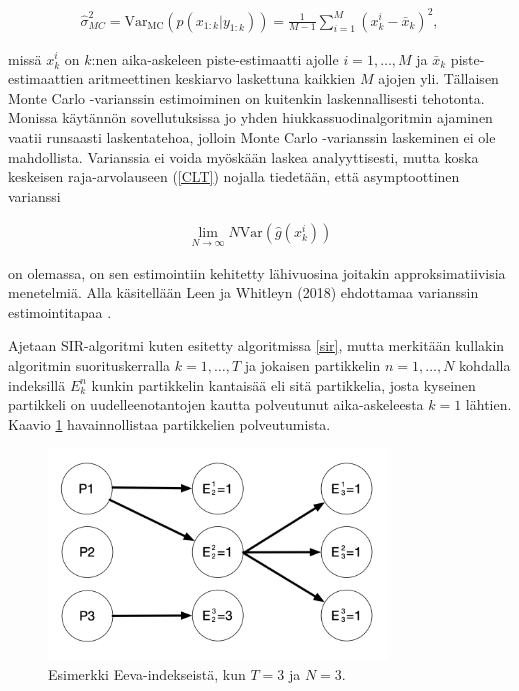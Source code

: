 \documentclass[
  12pt,
  a4paper, twoside]{book}
\begin{document}
\begin{align}\label{MC-varianssi}
\hat{\sigma}^2_{MC} = \text{Var}_{\text{MC}}(\hat{p}(x_{1:k}|y_{1:k})) = \frac{1}{M-1} \sum_{i=1}^{M}(x_k^i-\bar{x}_k)^2
,\end{align}

\noindent missä \(x_k^i\) on \(k\):nen aika-askeleen piste-estimaatti ajolle \(i=1,\ldots,M\) ja \(\bar{x}_k\) piste-estimaattien aritmeettinen keskiarvo laskettuna kaikkien \(M\) ajojen yli. Tällaisen Monte Carlo -varianssin estimoiminen on kuitenkin laskennallisesti tehotonta. Monissa käytännön sovellutuksissa jo yhden hiukkassuodinalgoritmin ajaminen vaatii runsaasti laskentatehoa, jolloin Monte Carlo -varianssin laskeminen ei ole mahdollista. Varianssia ei voida myöskään laskea analyyttisesti, mutta koska keskeisen raja-arvolauseen (\ref{CLT}) nojalla tiedetään, että asymptoottinen varianssi

\begin{align}\label{asymptoottinen-varianssi}
\lim_{N\to \infty} N \text {Var}(\hat{g}(x_k^i))
\end{align}

\noindent on olemassa, on sen estimointiin kehitetty lähivuosina joitakin approksimatiivisia menetelmiä. Alla käsitellään Leen ja Whitleyn (2018) ehdottamaa varianssin estimointitapaa \citep{Lee-2018}.

Ajetaan SIR-algoritmi kuten esitetty algoritmissa \ref{sir}, mutta merkitään kullakin algoritmin suorituskerralla \(k=1,\ldots,T\) ja jokaisen partikkelin \(n=1,\ldots,N\) kohdalla indeksillä \(E_k^n\) kunkin partikkelin kantaisää eli sitä partikkelia, josta kyseinen partikkeli on uudelleenotantojen kautta polveutunut aika-askeleesta \(k=1\) lähtien. Kaavio \ref{fig:eeva-indeksit} havainnollistaa partikkelien polveutumista.

\begin{figure}[H]
\centering
\includegraphics[width=9cm]{eevaindeksit}
\caption{Esimerkki Eeva-indekseistä, kun $T=3$ ja $N=3$.}
\label{fig:eeva-indeksit}
\end{figure}
\end{document}
